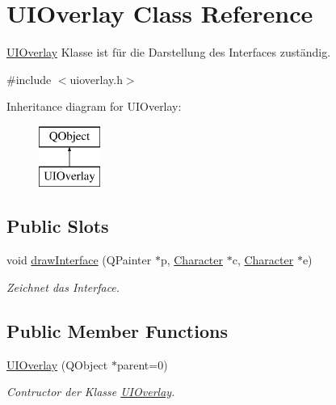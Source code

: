\hypertarget{class_u_i_overlay}{}\section{U\+I\+Overlay Class Reference}
\label{class_u_i_overlay}


\hyperlink{class_u_i_overlay}{U\+I\+Overlay} Klasse ist für die Darstellung des Interfaces zuständig.  




{\ttfamily \#include $<$uioverlay.\+h$>$}

Inheritance diagram for U\+I\+Overlay\+:\begin{figure}[H]
\begin{center}
\leavevmode
\includegraphics[height=2.000000cm]{class_u_i_overlay}
\end{center}
\end{figure}
\subsection*{Public Slots}
\begin{DoxyCompactItemize}
\item 
void \hyperlink{class_u_i_overlay_a9b3960185a836ecb504ce25d22c1893e}{draw\+Interface} (Q\+Painter $\ast$p, \hyperlink{class_character}{Character} $\ast$c, \hyperlink{class_character}{Character} $\ast$e)
\begin{DoxyCompactList}\small\item\em Zeichnet das Interface. \end{DoxyCompactList}\end{DoxyCompactItemize}
\subsection*{Public Member Functions}
\begin{DoxyCompactItemize}
\item 
\hyperlink{class_u_i_overlay_a51696f81d4333f2c7537a103d9440c47}{U\+I\+Overlay} (Q\+Object $\ast$parent=0)
\begin{DoxyCompactList}\small\item\em Contructor der Klasse \hyperlink{class_u_i_overlay}{U\+I\+Overlay}. \end{DoxyCompactList}\end{DoxyCompactItemize}


